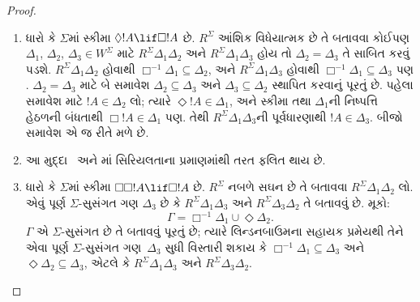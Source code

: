 \documentclass[../../../include/open-logic-section]{subfiles}
\begin{document}
\begin{proof}
  \begin{enumerate}
  \item ધારો કે $\Sigma$માં સ્કીમા $\Diamond !A \lif
    \Box !A$ છે. $R^\Sigma$ આંશિક વિધેયાત્મક છે તે બતાવવા
    કોઈપણ $\Delta_1$, $\Delta_2$, $\Delta_3 \in W^\Sigma$
    માટે $R^\Sigma \Delta_1\Delta_2$ અને $R^\Sigma
    \Delta_1\Delta_3$ હોય તો $\Delta_2=\Delta_3$ તે સાબિત કરવું
    પડશે. $R^\Sigma \Delta_1\Delta_2$ હોવાથી
    $\Box^{-1}\Delta_1 \subseteq \Delta_2$, અને
    $R^\Sigma \Delta_1\Delta_3$ હોવાથી
    $\Box^{-1}\Delta_1 \subseteq \Delta_3$ પણ
    .
    $\Delta_2=\Delta_3$ માટે બે સમાવેશ
    $\Delta_2 \subseteq \Delta_3$ અને $\Delta_3 \subseteq
    \Delta_2$ સ્થાપિત કરવાનું પૂરતું છે. પહેલા સમાવેશ માટે
    $!A \in \Delta_2$ લો; ત્યારે $\Diamond!A \in \Delta_1$,
    અને સ્કીમા તથા $\Delta_1$ની નિષ્પત્તિ હેઠળની બંધતાથી
    $\Box!A \in \Delta_1$ પણ. તેથી $R^\Sigma
    \Delta_1\Delta_3$ની પૂર્વધારણાથી $!A \in \Delta_3$.
    બીજો સમાવેશ એ જ રીતે મળે છે.

  \item આ મુદ્દા~ અને
    માં સિરિયલતાના પ્રમાણમાંથી
    તરત ફલિત થાય છે.

  \item ધારો કે $\Sigma$માં સ્કીમા $\Box\Box!A \lif \Box!A$
    છે. $R^\Sigma$ નબળે સઘન છે તે બતાવવા $R^\Sigma
    \Delta_1\Delta_2$ લો. એવું પૂર્ણ $\Sigma$-સુસંગત
    ગણ $\Delta_3$ છે કે $R^\Sigma \Delta_1\Delta_3$ અને
    $R^\Sigma \Delta_3\Delta_2$ તે બતાવવું છે. મૂકો:
    \[
    \Gamma = \Box^{-1}\Delta_1 \cup \Diamond\Delta_2.
    \]
    $\Gamma$ એ $\Sigma$-સુસંગત છે તે બતાવવું પૂરતું છે;
    ત્યારે લિન્ડનબાઉમના સહાયક પ્રમેયથી તેને એવા પૂર્ણ
    $\Sigma$-સુસંગત ગણ~$\Delta_3$ સુધી વિસ્તારી શકાય કે
    $\Box^{-1}\Delta_1 \subseteq \Delta_3$ અને
    $\Diamond\Delta_2 \subseteq \Delta_3$, એટલે કે
    $R^\Sigma \Delta_1\Delta_3$ અને $R^\Sigma
    \Delta_3\Delta_2$.


\end{enumerate}
\end{proof}
\end{document}
